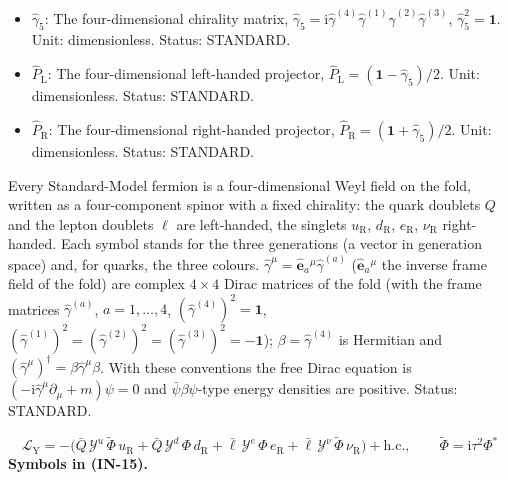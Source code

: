 \documentclass[
  10pt,
]{article}
\begin{document}
\begin{itemize}
\item
  \(\hat\gamma_5\): The four-dimensional chirality matrix,
  \(\hat\gamma_5 = \mathrm{i}\hat\gamma^{(4)}\hat\gamma^{(1)}\hat\gamma^{(2)}\hat\gamma^{(3)}\),
  \(\hat\gamma_5^2 = \mathbf{1}\). Unit: dimensionless. Status:
  STANDARD.
\item
  \(\hat P_{\mathrm{L}}\): The four-dimensional left-handed projector,
  \(\hat P_{\mathrm{L}} = (\mathbf{1} - \hat\gamma_5)/2\). Unit:
  dimensionless. Status: STANDARD.
\item
  \(\hat P_{\mathrm{R}}\): The four-dimensional right-handed projector,
  \(\hat P_{\mathrm{R}} = (\mathbf{1} + \hat\gamma_5)/2\). Unit:
  dimensionless. Status: STANDARD.
\end{itemize}

Every Standard-Model fermion is a four-dimensional Weyl field on the
fold, written as a four-component spinor with a fixed chirality: the
quark doublets \(Q\) and the lepton doublets \(\ell\) are left-handed,
the singlets \(u_{\mathrm{R}}\), \(d_{\mathrm{R}}\), \(e_{\mathrm{R}}\),
\(\nu_{\mathrm{R}}\) right-handed. Each symbol stands for the three
generations (a vector in generation space) and, for quarks, the three
colours. \(\hat\gamma^\mu = \hat{\mathbf{e}}_a{}^\mu\hat\gamma^{(a)}\)
(\(\hat{\mathbf{e}}_a{}^\mu\) the inverse frame field of the fold) are
complex \(4 \times 4\) Dirac matrices of the fold (with the frame
matrices \(\hat\gamma^{(a)}\), \(a = 1, \dots, 4\),
\((\hat\gamma^{(4)})^2 = \mathbf{1}\),
\((\hat\gamma^{(1)})^2 = (\hat\gamma^{(2)})^2 = (\hat\gamma^{(3)})^2 = -\mathbf{1}\));
\(\beta = \hat\gamma^{(4)}\) is Hermitian and
\((\hat\gamma^\mu)^\dagger = \beta\hat\gamma^\mu\beta\). With these
conventions the free Dirac equation is
\((-\mathrm{i}\hat\gamma^\mu\partial_\mu + m)\psi = 0\) and
\(\bar\psi\beta\psi\)-type energy densities are positive. Status:
STANDARD.

\[
\mathcal{L}_{\mathrm{Y}} = -\big(\bar Q\,\mathcal{Y}^{u}\,\tilde\Phi\,u_{\mathrm{R}} + \bar Q\,\mathcal{Y}^{d}\,\Phi\,d_{\mathrm{R}}
 + \bar\ell\,\mathcal{Y}^{e}\,\Phi\,e_{\mathrm{R}} + \bar\ell\,\mathcal{Y}^{\nu}\,\tilde\Phi\,\nu_{\mathrm{R}}\big)
 + \mathrm{h.c.},\qquad \tilde\Phi = \mathrm{i}\tau^2\Phi^* \tag{IN-15}
\] \textbf{Symbols in (IN-15).}
\end{document}
